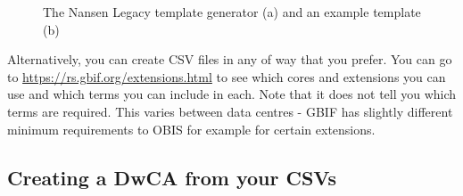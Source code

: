 \documentclass[a4paper,english, 11pt]{article}
\begin{document}
\begin{figure}[htb]
    \caption{\label{fig:tg}
        The Nansen Legacy template generator (a) and an example template (b)
    }
\end{figure}

Alternatively, you can create CSV files in any of way that you prefer. You can go to \url{https://rs.gbif.org/extensions.html} to see which cores and extensions you can use and which terms you can include in each. Note that it does not tell you which terms are required. This varies between data centres - GBIF has slightly different minimum requirements to OBIS for example for certain extensions.

\subsection{Creating a DwCA from your CSVs}
\label{ss:csv2dwca}
\end{document}
